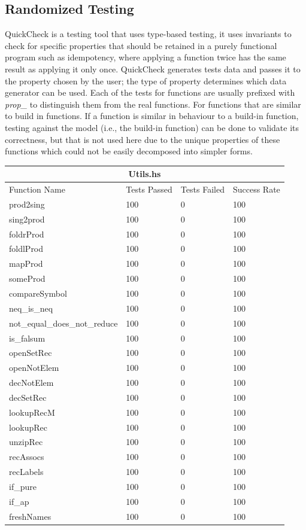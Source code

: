\documentclass[12pt, svgnames]{article}
\begin{document}
\subsection{Randomized Testing}
QuickCheck is a  testing tool that uses type-based testing, it uses invariants 
to check for specific properties that should be retained in a purely functional 
program such as idempotency, where applying a function twice has the same 
result as applying it only once. QuickCheck generates tests data and passes it 
to the property chosen by the user; the type of property determines which data 
generator can be used. Each of the tests for functions are usually prefixed 
with \textit{prop\_} to distinguish them from the real functions. For functions 
that are similar to build in functions. If a function is similar in behaviour 
to a build-in function, testing against the model (i.e., the build-in function) 
can be done to validate its correctness, but that is not used here due to the 
unique properties of these functions which could not be easily decomposed into 
simpler forms.
\begin{adjustwidth}{-0.5cm}{}   
\begin{tabular}[h!]{ |p{5cm}||p{3cm}|p{3cm}|p{3cm}|  }
    \hline
    \multicolumn{4}{|c|}{Utils.hs} \\
    \hline
    Function Name & Tests Passed & Tests Failed & Success Rate\\
    \hline
    prod2sing   & 100    &0&   100\\
    sing2prod&   100  & 0   &100\\
    foldrProd &100 & 0&  100\\
    foldlProd &100 & 0&  100\\
    mapProd&   100  & 0&100\\
    someProd& 100  & 0   &100\\
    compareSymbol& 100  & 0&100\\
    neq\_is\_neq& 100  & 0&100\\
    not\_equal\_does\_not\_reduce& 100  & 0&100\\
    is\_falsum& 100  & 0&100\\
    openSetRec& 100  & 0&100\\
    openNotElem& 100  & 0&100\\
    decNotElem& 100  & 0&100\\
    decSetRec& 100  & 0&100\\
    lookupRecM& 100  & 0&100\\
    lookupRec& 100  & 0&100\\
    unzipRec& 100  & 0&100\\
    recAssocs& 100  & 0&100\\
    recLabels& 100  & 0&100\\
    if\_pure& 100  & 0&100\\
    if\_ap& 100  & 0&100\\
    freshNames& 100  & 0 &100\\
    \hline
\end{tabular}
\end{adjustwidth}
\end{document}
